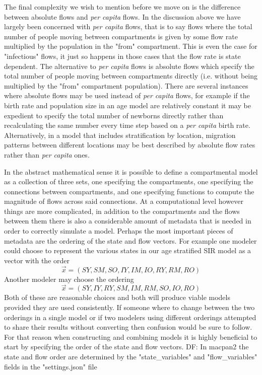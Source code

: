 \documentclass[pdflatex,sn-basic]{sn-jnl}%
\theoremstyle{definition}
\newcommand{\df}[1]{{\color{orange} DF: #1}}
\newcommand{\xvec}{\vec{x}}
\begin{document}
The final complexity we wish to mention before we move on is the difference between absolute flows and \emph{per capita} flows. In the discussion above we have largely been concerned with \emph{per capita} flows, that is to say flows where the total number of people moving between compartments is given by some flow rate multiplied by the population in the "from" compartment. This is even the case for "infectious" flows, it just so happens in those cases that the flow rate is state dependent. The alternative to \emph{per capita} flows is absolute flows which specify the total number of people moving between compartments directly (i.e. without being multiplied by the "from" compartment population). There are several instances where absolute flows may be used instead of \emph{per capita} flows, for example if the birth rate and population size in an age model are relatively constant it may be expedient to specify the total number of newborns directly rather than recalculating the same number every time step based on a \emph{per capita} birth rate. Alternatively, in a model that includes stratification by location, migration patterns between different locations may be best described by absolute flow rates rather than \emph{per capita} ones.

In the abstract mathematical sense it is possible to define a compartmental model as a collection of three sets, one specifying the compartments, one specifying the connections between compartments, and one specifying functions to compute the magnitude of flows across said connections. At a computational level however things are more complicated, in addition to the compartments and the flows between them there is also a considerable amount of metadata that is needed in order to correctly simulate a model. Perhaps the most important pieces of metadata are the ordering of the state and flow vectors. For example one modeler could choose to represent the various states in our age stratified SIR model as a vector with the order 
\[
    \xvec = (SY, SM, SO, IY, IM, IO, RY, RM, RO)
\]
Another modeler may choose the ordering
\[
    \xvec = (SY, IY, RY, SM, IM, RM, SO, IO, RO)
\]
Both of these are reasonable choices and both will produce viable models provided they are used consistently. If someone where to change between the two orderings in a single model or if two modelers using different orderings attempted to share their results without converting then confusion would be sure to follow. For that reason when constructing and combining models it is highly beneficial to start by specifying the order of the state and flow vectors. \df{In macpan2 the state and flow order are determined by the "state\_variables" and "flow\_variables" fields in the "settings.json" file}
\end{document}
